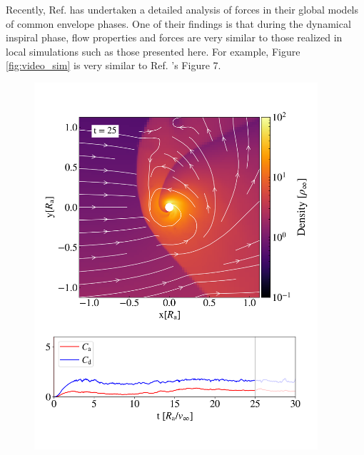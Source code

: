 Recently, Ref. \cite{Chamandy:2019psk} has undertaken a detailed analysis of forces in their global models of common envelope phases. One of their findings is that during the dynamical inspiral phase, flow properties and forces are very similar to those realized in local simulations such as those presented here. For example, Figure \ref{fig:video_sim} is very similar to Ref. \cite{Chamandy:2019psk}'s Figure 7. 




\begin{figure}[t]
\centering
  \includegraphics[width=10.5cm]{figures/common_envelope/movie_plot.pdf}

\end{figure}

